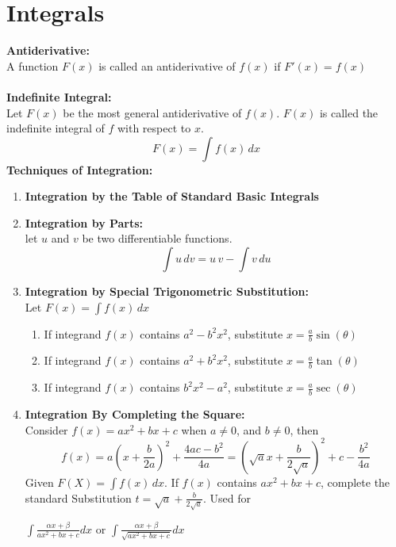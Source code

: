 \documentclass[14pt]{article}
\begin{document}
    \section{Integrals}
    \textbf{Antiderivative:}\\
    A function $F(x)$ is called an antiderivative of $f(x)$ if
    $F'(x)=f(x)$\\\\
    \textbf{Indefinite Integral:}\\
    Let $F(x)$ be the most general antiderivative of $f(x)$. $F(x)$ is
    called the indefinite integral of $f$ with respect to $x$.
    $$F(x)=\int f(x)\, dx$$ \textbf{Techniques of Integration:}\\
    \begin{enumerate}
        \item \textbf{Integration by the Table of Standard Basic Integrals}
        \item \textbf{Integration by Parts:}\\
        let $u$ and $v$ be two differentiable functions.
        $$\int u\, dv=u\, v-\int v\, du$$
        \item \textbf{Integration by Special Trigonometric
        Substitution:}\\
        Let $F(x)=\int f(x)\, dx$
        \begin{enumerate}
            \item If integrand $f(x)$ contains $a^2-b^2x^2$, substitute
            $x=\frac{a}{b}\sin(\theta)$
            \item If integrand $f(x)$ contains $a^2+b^2x^2$, substitute
            $x=\frac{a}{b}\tan(\theta)$
            \item If integrand $f(x)$ contains $b^2x^2-a^2$, substitute
            $x=\frac{a}{b}\sec(\theta)$
        \end{enumerate}
        \item \textbf{Integration By Completing the Square:}\\
        Consider $f(x)=ax^2+bx+c$ when $a\neq 0$, and $b\neq 0$, then
        $$f(x)=a\left(x+\frac{b}{2a}\right)^2+\frac{4ac-b^2}{4a}=\left(\sqrt{a}x+\frac{b}{2\sqrt{a}}\right)^2+c-\frac{b^2}{4a}$$
        Given $F(X)=\int f(x) \, dx$. If $f(x)$ contains $ax^2+bx+c$,
        complete the standard Substitution
        $t=\sqrt{a}+\frac{b}{2\sqrt{a}}$. Used for
        \begin{center}
            $\int\frac{\alpha x+\beta}{ax^2+bx+c}dx$ or
            $\int\frac{\alpha x+\beta}{\sqrt{ax^2+bx+c}}dx $

\end{center}
\end{enumerate}
\end{document}

